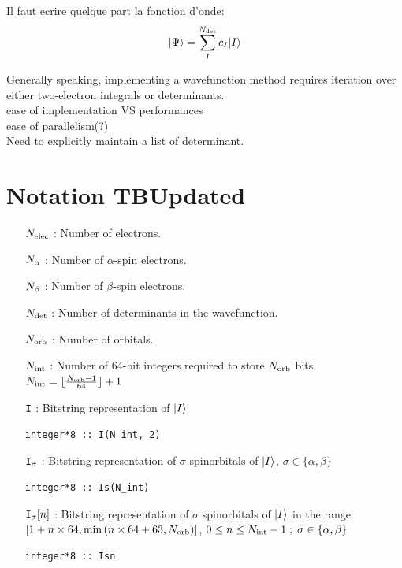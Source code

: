 \documentclass[./thesis.tex]{subfiles}
\begin{document}
\alert{ Il faut ecrire quelque part la fonction d'onde:
$$ \ket{\Psi} = \sum_I^{N_\text{det}} c_I {\ket{I}} $$}

Generally speaking, implementing a wavefunction method requires iteration over either two-electron integrals or determinants. \\
ease of implementation VS performances \\
ease of parallelism(?) \\
Need to explicitly maintain a list of determinant. \\




\section{Notation TBUpdated}
\begin{itemize}
	\item [${N_\text{elec}}$] : Number of electrons.
	\item [${N_\alpha}$] : Number of $\alpha$-spin electrons.
	\item [${N_\beta}$] : Number of $\beta$-spin electrons.
	\item [${N_\text{det}}$] : Number of determinants in the wavefunction.
	
	\item [${N_\text{orb}}$] : Number of orbitals.

	\item [${N_\text{int}}$] : Number of 64-bit integers required to store ${N_\text{orb}}$ bits.
        ${N_\text{int}} = \lfloor \frac{{N_\text{orb}}-1}{64} \rfloor + 1$
		
	\item [${\texttt{I}}$] : Bitstring representation of ${\ket{I}}$
\begin{lstlisting}
integer*8 :: I(N_int, 2)
\end{lstlisting}
	
	\item [${{\texttt{I}_{\sigma}}}$] : 
	Bitstring representation of $\sigma$ spinorbitals of ${\ket{I}}$, $\sigma \in \{\alpha, \beta\}$ 
\begin{lstlisting}
integer*8 :: Is(N_int)
\end{lstlisting}

	\item [ {${{\texttt{I}_{\sigma}}} [n] $} ] :
	Bitstring representation of $\sigma$ spinorbitals of ${\ket{I}}$ in the range $[ 1+n \times 64, \min \qty (n \times 64 + 63, {N_\text{orb}}) ]$, $0 \leq n \leq {N_\text{int}}-1 \; ;\; \sigma \in \{\alpha, \beta\}$
\begin{lstlisting}
integer*8 :: Isn
\end{lstlisting}

\end{itemize}
\end{document}
